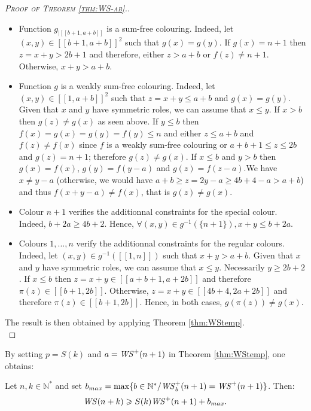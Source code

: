 \begin{proof}[\textsc{Proof of Theorem \ref{thm:WS-ab}.}]
\begin{itemize}
\item Function \(g_{|[\![b + 1, a + b]\!]}\) is a sum-free colouring. Indeed, let \((x, y) \in 
	[\![b + 1, a + b]\!]^2\) such that \(g(x) = g(y)\). If \(g(x) = n + 1\) then \(z = x + y > 2 b + 1\) 
	and therefore, either \(z > a + b\) or \(f(z) \neq n + 1\). Otherwise, \(x + y > a + b\).
\item Function \(g\) is a weakly sum-free colouring. Indeed, let \((x, y) \in [\![1, a + b]\!]^2\) such that 
	\(z = x + y \leqslant a + b\) and \(g(x) = g(y)\). Given that \(x\) and \(y\) have symmetric roles, 
	we can assume that \(x \leqslant y\). If \(x > b\) then \(g(z) \neq g(x)\) as seen above. If \(y \leqslant b\) then 
	\(f(x) = g(x) = g(y) = f(y) \leqslant n\) and either \(z \leqslant a + b\) and \(f(z) \neq f(x)\) since \(f\) is a weakly 
	sum-free colouring or \(a + b + 1 \leqslant z \leqslant 2 b\) and \(g(z) = n + 1\); therefore \(g(z) \neq g(x)\). If 
	\(x \leqslant b\) and \(y > b\) then \(g(x) = f(x)\), \(g(y) = f(y - a)\) and \(g(z) = f(z - a)\).We have \(x \neq y - a\) 
	(otherwise, we would have \(a + b \geqslant z = 2 y  - a \geqslant 4 b + 4 - a > a + b\)) and thus \(f(x + y - a) \neq f(x)\),
	that is \(g(z) \neq g(x)\).
\item Colour \(n + 1\) verifies the additionnal constraints for the special colour. Indeed, \(b + 2 a \geqslant 4 b + 2\). 
	Hence, \(\forall (x, y) \in g^{-1}(\{n + 1\}), x + y \leqslant b + 2 a\).
\item Colours \(1, ..., n\) verify the additionnal constraints for the regular colours. Indeed, let 
	\((x, y) \in g^{-1}([\![1, n]\!])\) such that \(x + y > a + b\). Given that \(x\) and \(y\) have symmetric roles, 
	we can assume that \(x \leqslant y\). Necessarily \(y \geqslant 2 b + 2\). If \(x \leqslant b\) then 
	\(z = x + y \in [\![a + b + 1, a + 2 b]\!]\) and therefore \(\pi(z) \in [\![b + 1, 2 b]\!]\). Otherwise, 
	\(z = x + y \in [\![4 b + 4, 2 a + 2 b]\!]\) and therefore \(\pi(z) \in [\![b + 1, 2 b]\!]\). Hence, in both cases, 
	\(g(\pi(z)) \neq g(x)\).
\end{itemize}

The result is then obtained by applying Theorem \ref{thm:WStemp}. \\
\end{proof}

By setting \(p = S(k)\) and \(a = \mathit{WS}^+(n + 1)\) in Theorem \ref{thm:WStemp}, one obtains:

\begin{corollary}
\label{cor:ineqWS+}
Let \(n,k \in \mathbb{N}^*\) and set \( b_{max} = \max \{b\in \mathbb{N}^*/ \mathit{WS}_b^+(n+1) = \mathit{WS}^+(n+1)\}\).
Then:
\[
\mathit{WS}(n+k) \geqslant S(k) \mathit{WS}^+(n+1)+b_{max}.
\]
\end{corollary}

